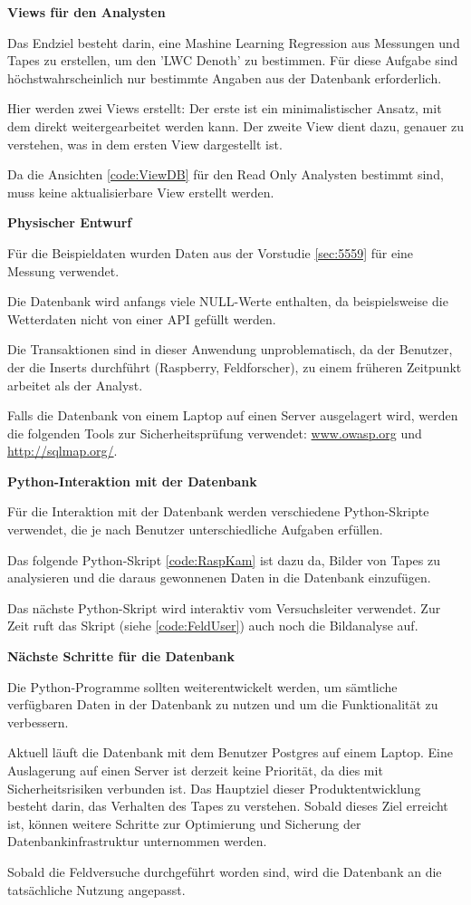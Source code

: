 \textbf{Views für den Analysten}

Das Endziel besteht darin, eine Mashine Learning Regression aus Messungen und Tapes zu erstellen, um den 'LWC Denoth' zu bestimmen. Für diese Aufgabe sind höchstwahrscheinlich nur bestimmte Angaben aus der Datenbank erforderlich.

Hier werden zwei Views erstellt: Der erste ist ein minimalistischer Ansatz, mit dem direkt weitergearbeitet werden kann. Der zweite View dient dazu, genauer zu verstehen, was in dem ersten View dargestellt ist.

Da die Ansichten \ref{code:ViewDB} für den Read Only Analysten bestimmt sind, muss keine aktualisierbare View erstellt werden.



\textbf{Physischer Entwurf}

Für die Beispieldaten wurden Daten aus der Vorstudie \ref{sec:5559} für eine Messung verwendet.

Die Datenbank wird anfangs viele NULL-Werte enthalten, da beispielsweise die Wetterdaten nicht von einer API gefüllt werden.

Die Transaktionen sind in dieser Anwendung unproblematisch, da der Benutzer, der die Inserts durchführt (Raspberry, Feldforscher), zu einem früheren Zeitpunkt arbeitet als der Analyst.

Falls die Datenbank von einem Laptop auf einen Server ausgelagert wird, werden die folgenden Tools zur Sicherheitsprüfung verwendet: \href{https://www.owasp.org}{www.owasp.org} und \href{http://sqlmap.org/}{http://sqlmap.org/}.

\textbf{Python-Interaktion mit der Datenbank}

Für die Interaktion mit der Datenbank werden verschiedene Python-Skripte verwendet, die je nach Benutzer unterschiedliche Aufgaben erfüllen.

Das folgende Python-Skript \ref{code:RaspKam} ist dazu da, Bilder von Tapes zu analysieren und die daraus gewonnenen Daten in die Datenbank einzufügen.

Das nächste Python-Skript wird interaktiv vom Versuchsleiter verwendet. Zur Zeit ruft das Skript (siehe  \ref{code:FeldUser}) auch noch die Bildanalyse auf.


\textbf{Nächste Schritte für die Datenbank}

Die Python-Programme sollten weiterentwickelt werden, um sämtliche verfügbaren Daten in der Datenbank zu nutzen und um die Funktionalität zu verbessern.

Aktuell läuft die Datenbank mit dem Benutzer Postgres auf einem Laptop. Eine Auslagerung auf einen Server ist derzeit keine Priorität, da dies mit Sicherheitsrisiken verbunden ist. Das Hauptziel dieser Produktentwicklung besteht darin, das Verhalten des Tapes zu verstehen. Sobald dieses Ziel erreicht ist, können weitere Schritte zur Optimierung und Sicherung der Datenbankinfrastruktur unternommen werden.

Sobald die Feldversuche durchgeführt worden sind, wird die Datenbank an die tatsächliche Nutzung angepasst.


